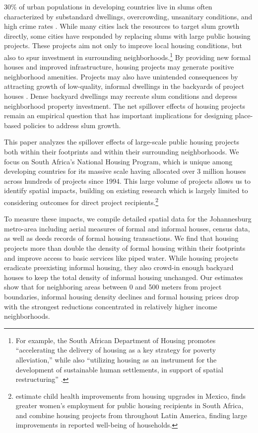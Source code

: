 \documentclass[12pt]{article}
\begin{document}
30\% of urban populations in developing countries live in slums often characterized by substandard dwellings, overcrowding, unsanitary conditions, and high crime rates \citep{mdg}.  While many cities lack the resources to target slum growth directly, some cities have responded by replacing slums with large public housing projects.  These projects aim not only to improve local housing conditions, but also to spur investment in surrounding neighborhoods.\footnote{For example, the South African Department of Housing promotes ``accelerating the delivery of housing as a key strategy for poverty alleviation,'' while also ``utilizing housing as an instrument for the development of sustainable human settlements, in support of spatial restructuring'' \citep{bng}.}  By providing new formal houses and improved infrastructure, housing projects may generate positive neighborhood amenities.  Projects may also have unintended consequences by attracting growth of low-quality, informal dwellings in the backyards of project houses \citep{Brueckner2018backyarding}.  Dense backyard dwellings may recreate slum conditions and depress neighborhood property investment.  The net spillover effects of housing projects remain an empirical question that has important implications for designing place-based policies to address slum growth.

This paper analyzes the spillover effects of large-scale public housing projects both within their footprints and within their surrounding neighborhoods.  We focus on South Africa's National Housing Program, which is unique among developing countries for its massive scale having allocated over 3 million houses across hundreds of projects since 1994.  This large volume of projects allows us to identify spatial impacts, building on existing research which is largely limited to considering outcomes for direct project recipients.\footnote{\cite{cattaneo2009housing} estimate child health improvements from housing upgrades in Mexico, \cite{franklin2016enabled} finds greater women's employment for public housing recipients in South Africa, and \cite{galiani2017shelter} combine housing projects from throughout Latin America, finding large improvements in reported well-being of households.}  

To measure these impacts, we compile detailed spatial data for the Johannesburg metro-area including aerial measures of formal and informal houses, census data, as well as deeds records of formal housing transactions.  We find that housing projects more than double the density of formal housing within their footprints and improve access to basic services like piped water.  While housing projects eradicate preexisting informal housing, they also crowd-in enough backyard houses to keep the total density of informal housing unchanged.  Our estimates show that for neighboring areas between 0 and 500 meters from project boundaries, informal housing density declines and formal housing prices drop with the strongest reductions concentrated in relatively higher income neighborhoods.
\end{document}
